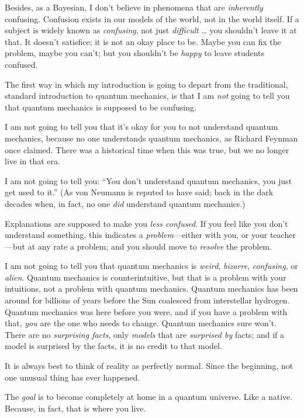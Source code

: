 {
 Besides, as a Bayesian, I don't believe in
phenomena that are \textit{inherently} confusing. Confusion exists in
our models of the world, not in the world itself. If a subject is
widely known as \textit{confusing}, not just \textit{difficult} \ldots
you shouldn't leave it at that. It
doesn't satisfice; it is not an okay place to be. Maybe
you can fix the problem, maybe you can't; but you
shouldn't be \textit{happy} to leave students
confused.}

{
 The first way in which my introduction is going to depart from the
traditional, standard introduction to quantum mechanics, is that I am
\textit{not} going to tell you that quantum mechanics is supposed to be
confusing.}

{
 I am not going to tell you that it's okay for you
to not understand quantum mechanics, because no one understands quantum
mechanics, as Richard Feynman once claimed. There was a historical time
when this was true, but we no longer live in that era.}

{
 I am not going to tell you: ``You
don't understand quantum mechanics, you just get used
to it.'' (As von Neumann is reputed to have said;
back in the dark decades when, in fact, no one \textit{did} understand
quantum mechanics.)}

{
 Explanations are supposed to make you \textit{less confused}. If
you feel like you don't understand something, this
indicates a \textit{problem}{}---either with you, or your teacher---but
at any rate a problem; and you should move to \textit{resolve} the
problem.}

{
 I am not going to tell you that quantum mechanics is
\textit{weird}, \textit{bizarre}, \textit{confusing}, or
\textit{alien}. Quantum mechanics is counterintuitive, but that is a
problem with your intuitions, not a problem with quantum mechanics.
Quantum mechanics has been around for billions of years before the Sun
coalesced from interstellar hydrogen. Quantum mechanics was here before
you were, and if you have a problem with that, \textit{you} are the one
who needs to change. Quantum mechanics sure won't.
There are no \textit{surprising facts}, only \textit{models} that are
\textit{surprised by} facts; and if a model is surprised by the facts,
it is no credit to that model.}

{
 It is always best to think of reality as perfectly normal. Since
the beginning, not one unusual thing has ever happened.}

{
 The \textit{goal} is to become completely at home in a quantum
universe. Like a native. Because, in fact, that is where you live.}

